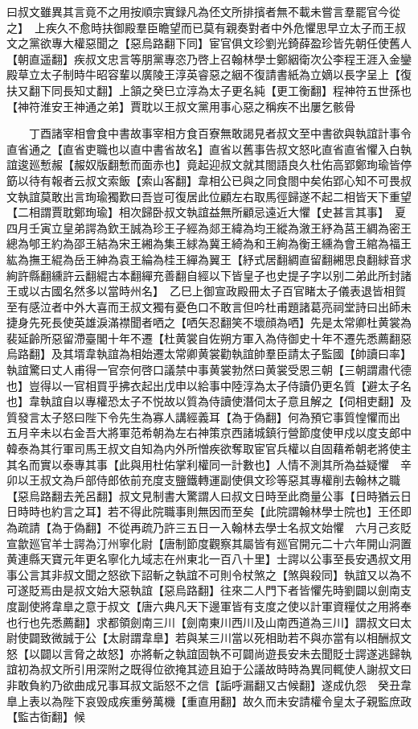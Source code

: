 曰叔文雖異其言竟不之用按順宗實録凡為伾文所排擯者無不載未嘗言羣罷官今從之】　上疾久不愈時扶御殿羣臣瞻望而已莫有親奏對者中外危懼思早立太子而王叔文之黨欲專大權惡聞之【惡烏路翻下同】宦官俱文珍劉光錡薛盈珍皆先朝任使舊人【朝直遥翻】疾叔文忠言等朋黨專恣乃啓上召翰林學士鄭絪衛次公李程王涯入金鑾殿草立太子制時牛昭容輩以廣陵王淳英睿惡之絪不復請書紙為立嫡以長字呈上【復扶又翻下同長知丈翻】上頷之癸巳立淳為太子更名純【更工衡翻】程神符五世孫也【神符淮安王神通之弟】賈耽以王叔文黨用事心惡之稱疾不出屢乞骸骨

　　丁酉諸宰相會食中書故事宰相方食百寮無敢謁見者叔文至中書欲與執誼計事令直省通之【直省吏職也以直中書省故名】直省以舊事告叔文怒叱直省直省懼入白執誼逡廵慙赧【赧奴版翻慙而面赤也】竟起迎叔文就其閤語良久杜佑高郢鄭珣瑜皆停筯以待有報者云叔文索飯【索山客翻】韋相公已與之同食閤中矣佑郢心知不可畏叔文執誼莫敢出言珣瑜獨歎曰吾豈可復居此位顧左右取馬徑歸遂不起二相皆天下重望【二相謂賈耽鄭珣瑜】相次歸卧叔文執誼益無所顧忌遠近大懼【史甚言其事】　夏四月壬寅立皇弟諤為欽王誠為珍王子經為郯王緯為均王縱為漵王紓為莒王綢為密王總為郇王約為邵王結為宋王緗為集王絿為冀王綺為和王絢為衡王纁為會王綰為福王紘為撫王緄為岳王紳為袁王綸為桂王繟為翼王【紓式居翻綢直留翻緗思良翻絿音求絢許縣翻纁許云翻緄古本翻繟充善翻自經以下皆皇子也史提子字以别二弟此所封諸王或以古國名然多以當時州名】　乙巳上御宣政殿冊太子百官睹太子儀表退皆相賀至有感泣者中外大喜而王叔文獨有憂色口不敢言但吟杜甫題諸葛亮祠堂詩曰出師未捷身先死長使英雄淚滿襟聞者哂之【哂矢忍翻笑不壞顔為哂】先是太常卿杜黄裳為裴延齡所惡留滯臺閣十年不遷【杜黄裳自佐朔方軍入為侍御史十年不遷先悉薦翻惡烏路翻】及其壻韋執誼為相始遷太常卿黄裳勸執誼帥羣臣請太子監國【帥讀曰率】執誼驚曰丈人甫得一官奈何啓口議禁中事黄裳勃然曰黄裳受恩三朝【三朝謂肅代德也】豈得以一官相買乎拂衣起出戊申以給事中陸淳為太子侍讀仍更名質【避太子名也】韋執誼自以專權恐太子不悦故以質為侍讀使潛伺太子意且解之【伺相吏翻】及質發言太子怒曰陛下令先生為寡人講經義耳【為于偽翻】何為預它事質惶懼而出　五月辛未以右金吾大將軍范希朝為左右神策京西諸城鎮行營節度使甲戍以度支郎中韓泰為其行軍司馬王叔文自知為内外所憎疾欲奪取宦官兵權以自固藉希朝老將使主其名而實以泰專其事【此與用杜佑掌利權同一計數也】人情不測其所為益疑懼　辛卯以王叔文為戶部侍郎依前充度支鹽鐵轉運副使俱文珍等惡其專權削去翰林之職【惡烏路翻去羌呂翻】叔文見制書大驚謂人曰叔文日時至此商量公事【日時猶云日日時時也約言之耳】若不得此院職事則無因而至矣【此院謂翰林學士院也】王伾即為疏請【為于偽翻】不從再疏乃許三五日一入翰林去學士名叔文始懼　六月己亥貶宣歙廵官羊士諤為汀州寧化尉【唐制節度觀察其屬皆有廵官開元二十六年開山洞置黄連縣天寶元年更名寧化九域志在州東北一百八十里】士諤以公事至長安遇叔文用事公言其非叔文聞之怒欲下詔斬之執誼不可則令杖煞之【煞與殺同】執誼又以為不可遂貶焉由是叔文始大惡執誼【惡烏路翻】往來二人門下者皆懼先時劉闢以劍南支度副使將韋臯之意于叔文【唐六典凡天下邊軍皆有支度之使以計軍資糧仗之用將奉也行也先悉薦翻】求都領劍南三川【劍南東川西川及山南西道為三川】謂叔文曰太尉使闢致微誠于公【太尉謂韋臯】若與某三川當以死相助若不與亦當有以相酬叔文怒【以闢以言脅之故怒】亦將斬之執誼固執不可闢尚遊長安未去聞貶士諤遂逃歸執誼初為叔文所引用深附之既得位欲掩其迹且廹于公議故時時為異同輒使人謝叔文曰非敢負約乃欲曲成兄事耳叔文詬怒不之信【詬呼漏翻又古候翻】遂成仇怨　癸丑韋臯上表以為陛下哀毁成疾重勞萬機【重直用翻】故久而未安請權令皇太子親監庶政【監古衘翻】候